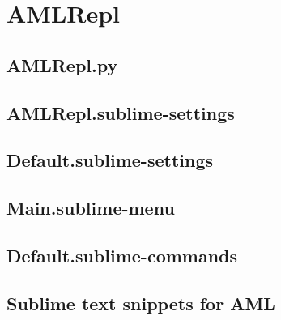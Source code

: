 \section{AMLRepl} %
\label{sec:amlrepl}


\subsection{AMLRepl.py} %
\label{sub:amlrepl_py}
\subsection{AMLRepl.sublime-settings} %
\label{sub:amlrepl_sublime_settings}
% 

\subsection{Default.sublime-settings} %
\label{sub:default_sublime_settings}
% 

\subsection{Main.sublime-menu} %
\label{sub:main_sublime_menu}
% 

\subsection{Default.sublime-commands} %
\label{sub:sublime_commands}
% 


\subsection{Sublime text snippets for AML} %
\label{sub:aml_sublime_snippet_py}

